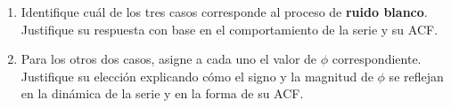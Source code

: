 \documentclass[10pt,a4paper]{article}
\begin{document}
\begin{enumerate}
\begin{enumerate}
    \item  Identifique cuál de los tres casos corresponde al proceso de \textbf{ruido blanco}. Justifique su respuesta con base en el comportamiento de la serie y su ACF.



    \item Para los otros dos casos, asigne a cada uno el valor de \( \phi \) correspondiente. Justifique su elección explicando cómo el signo y la magnitud de \( \phi \) se reflejan en la dinámica de la serie y en la forma de su ACF.


\end{enumerate}



\end{enumerate}
\end{document}
